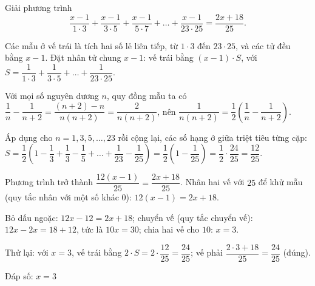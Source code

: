 \begin{problem}[8DS-PT1-031]
Giải phương trình
\[ \dfrac{x - 1}{1 \cdot 3} + \dfrac{x - 1}{3 \cdot 5} + \dfrac{x - 1}{5 \cdot 7} + \dots + \dfrac{x - 1}{23 \cdot 25} = \dfrac{2x + 18}{25}. \]

\begin{solution}
Các mẫu ở vế trái là tích hai số lẻ liên tiếp, từ $1 \cdot 3$ đến $23 \cdot 25$, và các tử đều bằng $x - 1$. Đặt nhân tử chung $x - 1$: vế trái bằng $(x - 1) \cdot S$, với $S = \dfrac{1}{1 \cdot 3} + \dfrac{1}{3 \cdot 5} + \dots + \dfrac{1}{23 \cdot 25}$.

Với mọi số nguyên dương $n$, quy đồng mẫu ta có $\dfrac{1}{n} - \dfrac{1}{n + 2} = \dfrac{(n + 2) - n}{n(n + 2)} = \dfrac{2}{n(n + 2)}$, nên $\dfrac{1}{n(n + 2)} = \dfrac{1}{2}\left(\dfrac{1}{n} - \dfrac{1}{n + 2}\right)$.

Áp dụng cho $n = 1, 3, 5, \dots, 23$ rồi cộng lại, các số hạng ở giữa triệt tiêu từng cặp: $S = \dfrac{1}{2}\left(1 - \dfrac{1}{3} + \dfrac{1}{3} - \dfrac{1}{5} + \dots + \dfrac{1}{23} - \dfrac{1}{25}\right) = \dfrac{1}{2}\left(1 - \dfrac{1}{25}\right) = \dfrac{1}{2} \cdot \dfrac{24}{25} = \dfrac{12}{25}$.

Phương trình trở thành $\dfrac{12(x - 1)}{25} = \dfrac{2x + 18}{25}$. Nhân hai vế với $25$ để khử mẫu (quy tắc nhân với một số khác $0$): $12(x - 1) = 2x + 18$.

Bỏ dấu ngoặc: $12x - 12 = 2x + 18$; chuyển vế (quy tắc chuyển vế): $12x - 2x = 18 + 12$, tức là $10x = 30$; chia hai vế cho $10$: $x = 3$.

Thử lại: với $x = 3$, vế trái bằng $2 \cdot S = 2 \cdot \dfrac{12}{25} = \dfrac{24}{25}$; vế phải $\dfrac{2 \cdot 3 + 18}{25} = \dfrac{24}{25}$ (đúng).

Đáp số: $\boxed{x = 3}$
\end{solution}
\end{problem}


